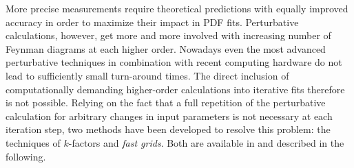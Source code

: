 More precise measurements
require theoretical predictions with equally improved accuracy in
order to maximize their impact in PDF fits.  Perturbative
calculations, however, get more and more involved with increasing
number of Feynman diagrams at each higher order. 
Nowadays even the most advanced perturbative techniques in
combination with recent computing hardware do not lead to sufficiently
small turn-around times. The direct inclusion of computationally
demanding higher-order calculations into iterative fits therefore is
not possible. Relying on the fact that a full repetition of the
perturbative calculation for arbitrary changes in input parameters is
not necessary at each iteration step, two methods have been developed
to resolve this problem: the techniques of $k$-factors and
\emph{fast grids}. Both are available in \fitter and described in the following.

